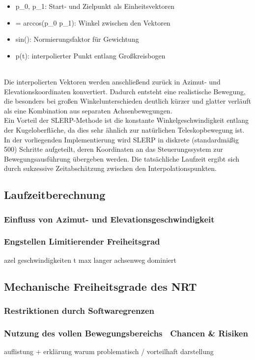\begin{itemize}
    \item p_0, p_1: Start- und Zielpunkt als Einheitsvektoren
    \item \omega = arccos(p_0 \cdot p_1): Winkel zwischen den Vektoren
    \item sin(\omega): Normierungsfaktor für Gewichtung
    \item p(t): interpolierter Punkt entlang Großkreisbogen
\end{itemize}
\\
Die interpolierten Vektoren werden anschließend zurück in Azimut- und Elevationskoordinaten konvertiert. Dadurch entsteht eine realistische Bewegung, die besonders bei großen Winkelunterschieden deutlich kürzer und glatter verläuft als eine Kombination aus separaten Achsenbewegungen.
\\
Ein Vorteil der SLERP-Methode ist die konstante Winkelgeschwindigkeit entlang der Kugeloberfläche, da dies sehr ähnlich zur natürlichen Teleskopbewegung ist.
In der vorliegenden Implementierung wird SLERP in diskrete (standardmäßig 500) Schritte aufgeteilt, deren Koordinaten an das Steuerungssystem zur Bewegungsausführung übergeben werden. Die tatsächliche Laufzeit ergibt sich durch sukzessive Zeitabschätzung zwischen den Interpolationspunkten.


\subsection{Laufzeitberechnung}

\subsubsection{Einfluss von Azimut- und Elevationsgeschwindigkeit}
\subsubsection{Engstellen \textendash Limitierender Freiheitsgrad}

azel geschwindigkeiten
t max
langer achsenweg dominiert

\subsection{Mechanische Freiheitsgrade des NRT}

\subsubsection{Restriktionen durch Softwaregrenzen}
\subsubsection{Nutzung des vollen Bewegungsbereichs \textendash~Chancen \& Risiken}

auflistung + erklärung warum problematisch / vorteilhaft
darstellung

